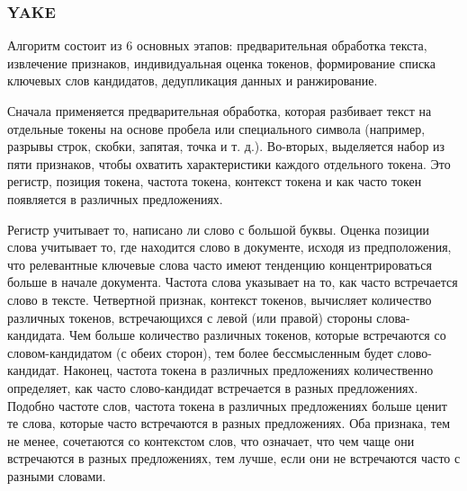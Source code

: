 \documentclass[14pt]{matmex-diploma-custom}
\begin{document}
%

\subsubsection{YAKE}
Алгоритм состоит из 6 основных этапов: предварительная обработка текста, извлечение признаков, индивидуальная оценка токенов, формирование списка ключевых слов кандидатов, дедупликация данных и ранжирование.

Сначала применяется предварительная обработка, которая разбивает текст на отдельные токены на основе пробела или специального символа (например, разрывы строк, скобки, запятая, точка и т. д.). Во-вторых, выделяется набор из пяти признаков, чтобы охватить характеристики каждого отдельного токена. Это регистр, позиция токена, частота токена, контекст токена и как часто токен появляется в различных предложениях.

Регистр учитывает то, написано ли слово с большой буквы.
Оценка позиции слова учитывает то, где находится слово в документе, исходя из предположения, что релевантные ключевые слова часто имеют тенденцию концентрироваться больше в начале документа. 
Частота слова указывает на то, как часто встречается слово в тексте. Четвертной признак, контекст токенов, вычисляет количество различных токенов, встречающихся с левой (или правой) стороны слова-кандидата. Чем больше количество различных токенов, которые встречаются со словом-кандидатом (с обеих сторон), тем более бессмысленным будет слово-кандидат. Наконец, частота токена в различных предложениях количественно определяет, как часто слово-кандидат встречается в разных предложениях. Подобно частоте слов, частота токена в различных предложениях больше ценит те слова, которые часто встречаются в разных предложениях. Оба признака, тем не менее, сочетаются со контекстом слов, что означает, что чем чаще они встречаются в разных предложениях, тем лучше, если они не встречаются часто с разными словами. 
\end{document}
